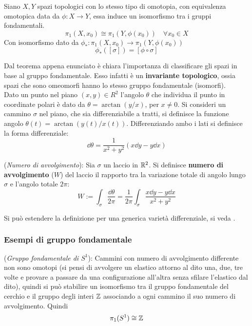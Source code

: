 \begin{theorem}
   Siano $X,Y$ spazi topologici con lo stesso tipo di omotopia, con equivalenza
   omotopica data da $\phi : X \to Y$, essa induce un isomorfismo tra i gruppi
   fondamentali.
   $$
      \pi_1(X,x_0) \cong \pi_1 (Y, \phi(x_0)) \quad \forall x_0 \in X
   $$
   Con isomorfismo dato da $\phi_* : \pi_1 (X,x_0) \to \pi_1 (Y,\phi(x_0))$
   $$
      \phi_*([\sigma]) = [\phi \circ \sigma]
   $$
\end{theorem}

Dal teorema appena enunciato è chiara l'importanza di classificare gli spazi in
base al gruppo fondamentale. Esso infatti è un \textbf{invariante topologico},
ossia spazi che sono omeomorfi hanno lo stesso gruppo fondamentale (isomorfi).\\

Dato un punto nel piano $(x,y) \in R^2$ l'angolo $\theta$ che individua il punto
in coordinate polari è dato da $\theta = \arctan(y/x)$, per $x \neq 0$. Si consideri
un cammino $\sigma$ nel piano, che sia differenziabile a tratti, si definisce
la funzione angolo $\theta(t) = \arctan (y(t)/x(t))$. Differenziando ambo i lati si
definisce la forma differenziale:
$$
  \dd \theta = \frac{1}{x^2+y^2}(x \dd y - y \dd x)
$$
\begin{definition}(\emph{Numero di avvolgimento}):
  Sia $\sigma$ un laccio in $\mathbb{R}^2$. Si definisce \textbf{numero di avvolgimento} ($W$)
  del laccio il rapporto tra la variazione totale di angolo lungo $\sigma$ e
  l'angolo totale $2\pi$:
  $$
     W := \int_\sigma \frac{\dd \theta}{2\pi}
        = \frac{1}{2\pi} \int_\sigma \frac{x \dd y - y \dd x}{x^2 + y^2}
  $$
\end{definition}
Si può estendere la definizione per una generica varietà differenziale, si veda
\cite{fulton}.\\


\subsubsection{Esempi di gruppo fondamentale}
\begin{example}
   (\emph{Gruppo fondamentale di $S^1$}): Cammini con numero di avvolgimento differente
   non sono omotopi (si pensi di avvolgere un elastico attorno al dito una, due, tre
   volte e provare a passare da una configurazione all'altra senza sfilare l'elastico
   dal dito), quindi si può stabilire un isomorfismo tra il gruppo fondamentale
   del cerchio e il gruppo degli interi $\mathbb{Z}$ associando a ogni cammino il suo numero
   di avvolgimento. Quindi
   $$
      \pi_1 (S^1) \cong \mathbb{Z}
   $$
\end{example}

